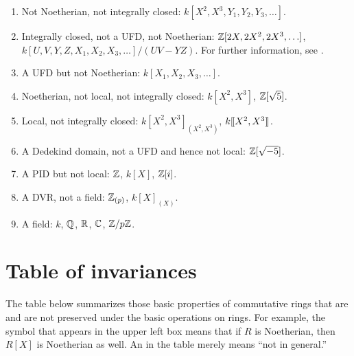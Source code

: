 \documentclass{ximera}
\begin{document}
\begin{multicols}{2}
\begin{enumerate}
\item\label{A:domain} Not Noetherian, not integrally closed:
$k[X^2,X^3,Y_1,Y_2,Y_3,\ldots]$.


\item\label{A:ic} Integrally closed, not a UFD, not Noetherian:
  $\mathbb Z[2X,2X^2,2X^3,\ldots]$, $k[U,V,Y,Z,X_1,X_2,X_3,\ldots]/(UV -
  YZ)$.  For further information, see \cite{hH1981}.

\item\label{A:ufd} A UFD but not Noetherian: $k[X_1,X_2,X_3,\ldots]$.

\item\label{A:n} Noetherian, not local, not integrally closed: $k[X^2,X^3]$, $\mathbb Z[\sqrt{5}]$. 

\item\label{A:l} Local, not integrally closed: $k[X^2,X^3]_{(X^2,X^3)}$, $k[\hspace{-0.25ex}[ X^2, X^3 ]\hspace{-0.25ex}]$.

\item\label{A:dd} A Dedekind domain, not a UFD and hence not local: $\mathbb Z[\sqrt{-5}]$.

\item\label{A:pid} A PID but not local: $\mathbb Z$, $k[X]$, $\mathbb Z[i]$.

\item\label{A:dvr} A DVR, not a field: $\mathbb Z_{(p)}$, $k[X]_{(X)}$.

\item\label{A:field} A field: $k$, $\mathbb Q$, $\mathbb R$, $\mathbb C$, $\mathbb Z/p\mathbb Z$.

\end{enumerate}
\end{multicols}

\newpage

\section{Table of invariances}

The table below summarizes those basic properties of commutative rings
that are and are not preserved under the basic operations on rings.
For example, the symbol  that appears in the upper left box
means that if $R$ is Noetherian, then $R[X]$ is Noetherian as well.
An  in the table merely means ``not in general.''
\end{document}
